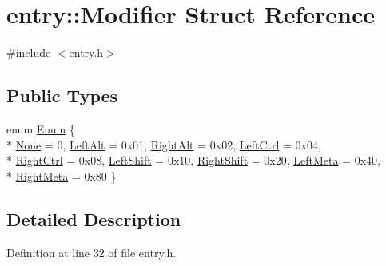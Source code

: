 \hypertarget{structentry_1_1_modifier}{\section{entry\+:\+:Modifier Struct Reference}
\label{structentry_1_1_modifier}
}


{\ttfamily \#include $<$entry.\+h$>$}

\subsection*{Public Types}
\begin{DoxyCompactItemize}
\item 
enum \hyperlink{structentry_1_1_modifier_a29426318048a34564b5b01026ce15a7c}{Enum} \{ \\*
\hyperlink{structentry_1_1_modifier_a29426318048a34564b5b01026ce15a7cac9b4a8c502a25ae401dcfa02a291887b}{None} = 0, 
\hyperlink{structentry_1_1_modifier_a29426318048a34564b5b01026ce15a7ca417222a442e2abbc360ce6c296c86ac3}{Left\+Alt} = 0x01, 
\hyperlink{structentry_1_1_modifier_a29426318048a34564b5b01026ce15a7caad2d8b36ff387525457481d119f495c8}{Right\+Alt} = 0x02, 
\hyperlink{structentry_1_1_modifier_a29426318048a34564b5b01026ce15a7cabcc09d2f61fc5ed33802ba6e71767bf9}{Left\+Ctrl} = 0x04, 
\\*
\hyperlink{structentry_1_1_modifier_a29426318048a34564b5b01026ce15a7ca828a1c726d5992a4b96bc3c0fbb2a5be}{Right\+Ctrl} = 0x08, 
\hyperlink{structentry_1_1_modifier_a29426318048a34564b5b01026ce15a7ca743e85149b608951a0bc4f2cbeca1e5e}{Left\+Shift} = 0x10, 
\hyperlink{structentry_1_1_modifier_a29426318048a34564b5b01026ce15a7ca9c1c46f3708b6110ef91461687522d48}{Right\+Shift} = 0x20, 
\hyperlink{structentry_1_1_modifier_a29426318048a34564b5b01026ce15a7cafdac8d02a2efd62ca1fb7017683925f2}{Left\+Meta} = 0x40, 
\\*
\hyperlink{structentry_1_1_modifier_a29426318048a34564b5b01026ce15a7cafc44abd7c804ac88143570ff83b8707f}{Right\+Meta} = 0x80
 \}
\end{DoxyCompactItemize}


\subsection{Detailed Description}


Definition at line 32 of file entry.\+h.




